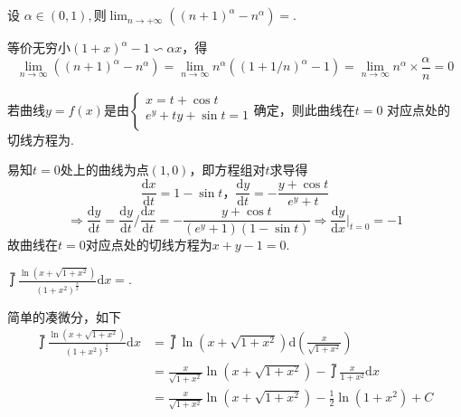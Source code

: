 \documentclass[hideanswer=false,
enfont=newtxtext,
zhfont=empty,
mathfont=newtxmath,
]{cmcthesis}
\begin{document}

\addvspace{1\bigskipamount}

\\\\
\wq 设 $\alpha\in\left(0,1\right),\textrm{则} \lim_{n\rightarrow +\infty}\left(\left(n+1\right)^{\alpha}-n^{\alpha}\right)=$\underline{\hspace{3em}}.\\
	\begin{answer}
	\begin{solution}
等价无穷小$\left(1+x\right)^{\alpha}-1\backsim\alpha x$，得
		\[
		\lim_{n\rightarrow\infty}\left(\left(n+1\right)^{\alpha}-n^{\alpha}\right)=\lim_{n\rightarrow\infty}n^{\alpha}\left(\left(1+1/n\right)^{\alpha}-1\right)=\lim_{n\rightarrow\infty}n^{\alpha}\times\frac{\alpha}{n}=0
		\]
	\end{solution}
	\end{answer}
\wq $\textrm{若曲线}y=f\left(x\right)\textrm{是由}\left\{\begin{array}{l}
x=t+\cos t\\
e^y+ty+\sin t=1\\
\end{array}\right.\textrm{确定，则此曲线在}t=0$ 对应点处的\\
切线方程为\underline{\hspace{3em}}.\\
	\begin{answer}
	\begin{solution}
易知$t=0$处上的曲线为点$(1,0)$，即方程组对$t$求导得
\[
\frac{\mathrm{d}x}{\mathrm{d}t}=1-\sin t\textbf{，}\frac{\mathrm{d}y}{\mathrm{d}t}=-\frac{y+\cos t}{e^y+t}
\]
\[
\Rightarrow\frac{\mathrm{d}y}{\mathrm{d}t}=\frac{\mathrm{d}y}{\mathrm{d}t}/\frac{\mathrm{d}x}{\mathrm{d}t}=-\frac{y+\cos t}{\left(e^y+1\right)\left(1-\sin t\right)}\Rightarrow\frac{\mathrm{d}y}{\mathrm{d}x}|_{t=0}=-1
\]
故曲线在$t=0$对应点处的切线方程为$x+y-1=0$.
	\end{solution}
	\end{answer}

\wq $\upint{\frac{\ln\left(x+\sqrt{1+x^2}\right)}{\left(1+x^2\right)^{\frac{3}{2}}}}\mathrm{d}x=$\underline{\hspace{3em}}.\\
	\begin{answer}
	\begin{solution}
简单的凑微分，如下
\begin{align*}
\upint{\frac{\ln\left(x+\sqrt{1+x^2}\right)}{\left(1+x^2\right)^{\frac{3}{2}}}}\mathrm{d}x&=\upint{\ln\left(x+\sqrt{1+x^2}\right)}\mathrm{d}\left(\frac{x}{\sqrt{1+x^2}}\right)\\
&=\frac{x}{\sqrt{1+x^2}}\ln\left(x+\sqrt{1+x^2}\right)-\upint{\frac{x}{1+x^2}\mathrm{d}x}\\
&=\frac{x}{\sqrt{1+x^2}}\ln\left(x+\sqrt{1+x^2}\right)-\frac{1}{2}\ln\left(1+x^2\right)+C
\end{align*}
	\end{solution}
	\end{answer}
\end{document}
